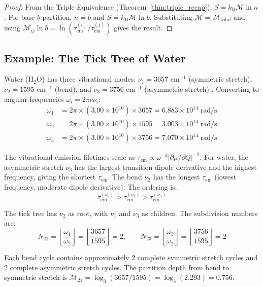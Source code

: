 \documentclass[11pt,a4paper]{article}
\theoremstyle{definition}
\theoremstyle{remark}
\newcommand{\kB}{k_{\mathrm{B}}}
\newcommand{\Depth}{\mathcal{M}}
\newcommand{\tem}{\tau_{\mathrm{em}}}
\begin{document}
\begin{proof}
From the Triple Equivalence (Theorem~\ref{thm:triple_recap}), $S = \kB \Depth \ln n$. For base-$b$ partition, $n = b$ and $S = \kB \Depth \ln b$. Substituting $\Depth = \Depth_{\mathrm{total}}$ and using $\Depth_{ij} \ln b = \ln(\tem^{(i)}/\tem^{(j)})$ gives the result.
\end{proof}

\subsection{Example: The Tick Tree of Water}

Water (H$_2$O) has three vibrational modes: $\nu_1 = 3657$ cm$^{-1}$ (symmetric stretch), $\nu_2 = 1595$ cm$^{-1}$ (bend), and $\nu_3 = 3756$ cm$^{-1}$ (asymmetric stretch) \citep{shimanouchi1972, nist_webbook}. Converting to angular frequencies $\omega_i = 2\pi c \nu_i$:
\begin{align}
\omega_1 &= 2\pi \times (3.00 \times 10^{10}) \times 3657 = 6.883 \times 10^{14} \;\mathrm{rad/s} \\
\omega_2 &= 2\pi \times (3.00 \times 10^{10}) \times 1595 = 3.003 \times 10^{14} \;\mathrm{rad/s} \\
\omega_3 &= 2\pi \times (3.00 \times 10^{10}) \times 3756 = 7.070 \times 10^{14} \;\mathrm{rad/s}
\end{align}

The vibrational emission lifetimes scale as $\tem \propto \omega^{-3} |\partial\mu/\partial Q|^{-2}$. For water, the asymmetric stretch $\nu_3$ has the largest transition dipole derivative and the highest frequency, giving the shortest $\tem$. The bend $\nu_2$ has the longest $\tem$ (lowest frequency, moderate dipole derivative). The ordering is:
\begin{equation}
\tem^{(\nu_2)} > \tem^{(\nu_1)} > \tem^{(\nu_3)}
\end{equation}

The tick tree has $\nu_2$ as root, with $\nu_1$ and $\nu_3$ as children. The subdivision numbers are:
\begin{equation}
N_{21} = \left\lfloor \frac{\omega_1}{\omega_2} \right\rfloor = \left\lfloor \frac{3657}{1595} \right\rfloor = 2, \qquad
N_{23} = \left\lfloor \frac{\omega_3}{\omega_2} \right\rfloor = \left\lfloor \frac{3756}{1595} \right\rfloor = 2
\end{equation}

Each bend cycle contains approximately 2 complete symmetric stretch cycles and 2 complete asymmetric stretch cycles. The partition depth from bend to symmetric stretch is $\Depth_{21} = \log_3(3657/1595) = \log_3(2.293) = 0.756$.
\end{document}
